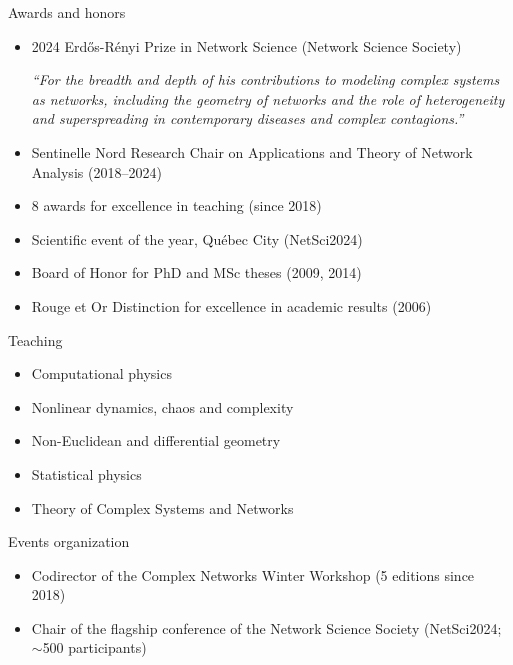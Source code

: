 \documentclass[10pt]{article}
\begin{document}
\vspace*{\baselineskip}
\begin{minipage}[t]{0.56\textwidth}
  {\large\color{monbleu}Awards and honors}
  \begin{itemize}
    \item 2024 Erd\H{o}s-Rényi Prize in Network Science (Network Science Society)
    \begin{center}
      \begin{minipage}{0.8\textwidth}
        \small\textit{``For the breadth and depth of his contributions to modeling complex systems as networks, including the geometry of networks and the role of heterogeneity and superspreading in contemporary diseases and complex contagions.''}
      \end{minipage}
    \end{center}
    \item Sentinelle Nord Research Chair on Applications and Theory of Network Analysis (2018--2024)
    \item 8 awards for excellence in teaching (since 2018)
    \item Scientific event of the year, Québec City (NetSci2024)
    \item Board of Honor for PhD and MSc theses (2009, 2014)
    \item Rouge et Or Distinction for excellence in academic results (2006)
  \end{itemize}
\end{minipage}
\hfill
\begin{minipage}[t]{0.42\textwidth}
  {\large\color{monbleu}Teaching}
  \begin{itemize}
    \item Computational physics
    \item Nonlinear dynamics, chaos and complexity
    \item Non-Euclidean and differential geometry
    \item Statistical physics
    \item Theory of Complex Systems and Networks 
  \end{itemize}
  {\large\color{monbleu}Events organization}
  \begin{itemize}
    \item Codirector of the Complex Networks Winter Workshop (5 editions since 2018)
    \item Chair of the flagship conference of the Network Science Society (NetSci2024; $\sim$500 participants)
  \end{itemize}
\end{minipage}
\end{document}
